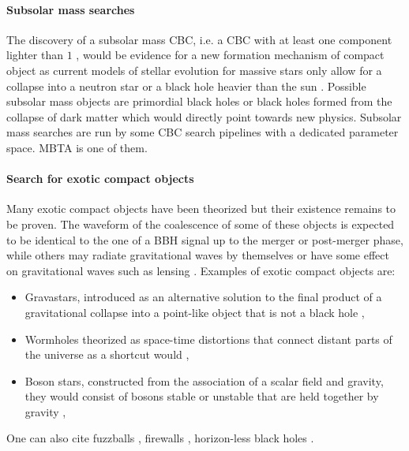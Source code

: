 \paragraph*{Subsolar mass searches}
\label{sec:ssm}
The discovery of a subsolar mass CBC, i.e. a CBC with at least one component lighter than $1$ \msun, would be evidence for a new formation mechanism of compact object as current models of stellar evolution for massive stars only allow for a collapse into a neutron star or a black hole heavier than the sun \cite{ssm_O3a,ssm_O3b}.
Possible subsolar mass objects are primordial black holes \cite{primordial_bh} or black holes formed from the collapse of dark matter \cite{dm1,dm2,dm3} which would directly point towards new physics.
Subsolar mass searches are run by some CBC search pipelines with a dedicated parameter space.
MBTA is one of them.


\paragraph*{Search for exotic compact objects}
\label{sec:exotic}
Many exotic compact objects have been theorized but their existence remains to be proven.
The waveform of the coalescence of some of these objects is expected to be identical to the one of a BBH signal up to the merger or post-merger phase, while others may radiate gravitational waves by themselves or have some effect on gravitational waves such as lensing \cite{ECO1,ECO2}.
Examples of exotic compact objects are:
\begin{itemize}
\item Gravastars, introduced as an alternative solution to the final product of a gravitational collapse into a point-like object that is not a black hole \cite{gravastar1,gravastar2},
\item Wormholes theorized as space-time distortions that connect distant parts of the universe as a shortcut would \cite{wormhole2,wormhole1},
\item Boson stars, constructed from the association of a scalar field and gravity, they would consist of bosons stable or unstable that are held together by gravity \cite{boson_star},
\end{itemize}
One can also cite fuzzballs \cite{fuzzball}, firewalls \cite{firewall}, horizon-less black holes \cite{horizonless_bh}.




